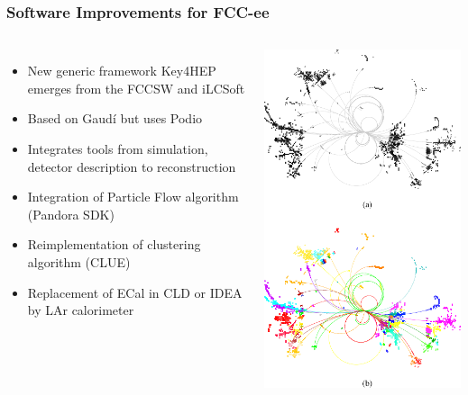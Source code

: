 \documentclass[aspectratio=169]{beamer}
\begin{document}
\begin{frame}
  \frametitle{Software Improvements for FCC-ee}

  \begin{columns}[c]
    \begin{itemize}
      \item New generic framework Key4HEP emerges from the FCCSW and iLCSoft
      \item Based on Gaudí but uses Podio
      \item Integrates tools from simulation, detector description to
            reconstruction
      \item Integration of Particle Flow algorithm (Pandora SDK)
      \item Reimplementation of clustering algorithm (CLUE)
      \item Replacement of ECal in CLD or IDEA by LAr calorimeter
    \end{itemize}

    \begin{center}
      \includegraphics[width=.7\linewidth]{figures/pandora_example.pdf}
    \end{center}
  \end{columns}
\end{frame}
\end{document}
